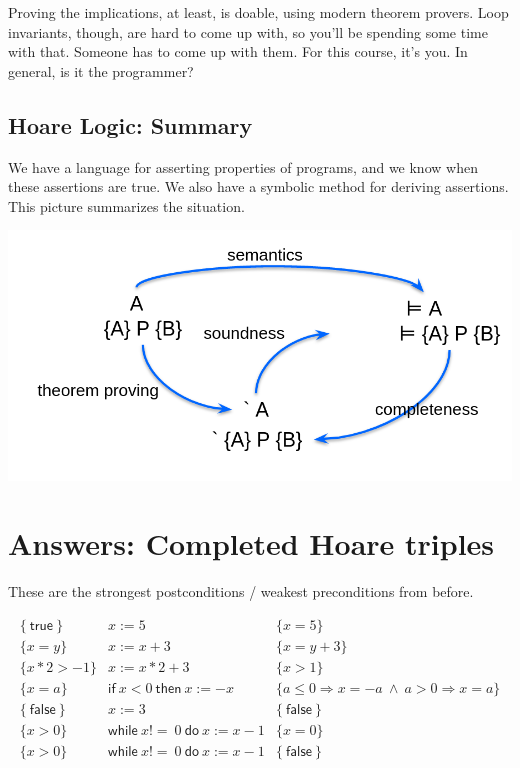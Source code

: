 \documentclass[11pt]{article}
\begin{document}
Proving the implications, at least, is doable, using modern theorem provers. Loop invariants, though, are hard to come up with, so you'll be spending some time with that. Someone has to come up with them. For this course, it's you. In general, is it the programmer?

\subsection*{Hoare Logic: Summary}
We have a language for asserting properties of programs, and we know when these assertions are true. We also have a symbolic method for deriving assertions. This picture summarizes the situation.

\includegraphics[width=\textwidth]{L12/everything.png}


\section*{Answers: Completed Hoare triples} These are the strongest postconditions / weakest preconditions from before.

\[
\begin{array}{lll}
  \{ \mathsf{~true~} \} & x := 5 &\{ x = 5 \} \\
  \{ x = y \} & x := x + 3 &\{ x = y + 3 \} \\
  \{ x * 2 > -1 \} & x := x * 2 + 3 &\{ x > 1 \} \\
  \{ x = a \} & \mathsf{if~} x < 0 \mathsf{~then~} x := -x  &\{ a \leq 0 \Rightarrow x = -a ~\wedge~ a > 0 \Rightarrow x = a \} \\
  \{ \mathsf{~false~} \} & x := 3  &\{ \mathsf{~false~} \} \\
  \{ x > 0 \} & \mathsf{while~} x \mathtt{!=~} 0 \mathsf{~do~} x := x - 1  &\{ x = 0 \} \\
  \{ x > 0 \} & \mathsf{while~} x \mathtt{!=~} 0 \mathsf{~do~} x := x - 1 & \{ \mathsf{~false~} \} \\
\end{array}
\]
\end{document}
